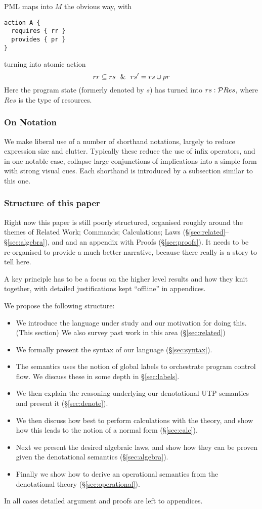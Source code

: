 PML maps into $M$ the obvious way,
with
\begin{verbatim}
action A {
  requires { rr }
  provides { pr }
}
\end{verbatim}
turning into atomic action
\[
rr \subseteq rs ~~\&~~ rs' = rs \cup pr
\]
Here the program state (formerly denoted by $s$)
has turned into $rs:\mathcal{P} Res$, where $Res$ is the type of resources.

\subsubsection{On Notation}

We make liberal use of a number of shorthand notations,
largely to reduce expression size and clutter.
Typically these reduce the use of infix operators,
and in one notable case, collapse large conjunctions
of implications into a simple form with strong visual cues.
Each shorthand is introduced by a subsection similar to this one.

\subsubsection{Structure of this paper}

Right now this paper is still poorly structured,
organised roughly around the themes of
Related Work;
Commands;
Calculations;
Laws (\S\ref{sec:related}--\S\ref{sec:algebra}),
and and an appendix with Proofs (\S\ref{sec:proofs}).
It needs to be re-organised to provide a much better narrative,
because there really is a story to tell here.

A key principle has to be a focus on the higher level results and how
they knit together,
with detailed justifications kept ``offline'' in appendices.

We propose the following structure:
\begin{itemize}
  \item
     We introduce the language under study and our motivation for doing this.
     (This section)
     We also survey past work in this area (\S\ref{sec:related})
  \item
    We formally present the syntax of our language (\S\ref{sec:syntax}).
  \item
     The semantics uses the notion of global labels to orchestrate
     program control flow. We discuss these in some depth in \S\ref{sec:labels}.
  \item
     We then explain the reasoning underlying our denotational
     UTP semantics and present it (\S\ref{sec:denote}).
  \item
     We then discuss how best to perform calculations with the theory,
     and show how this leads to the notion of a normal form
     (\S\ref{sec:calc}).
  \item
     Next we present the desired algebraic laws,
     and show how they can be proven given the denotational semantics
     (\S\ref{sec:algebra}).
  \item
     Finally we show how to derive an operational semantics from
     the denotational theory
     (\S\ref{sec:operational}).
\end{itemize}
In all cases detailed argument and proofs are left to appendices.
